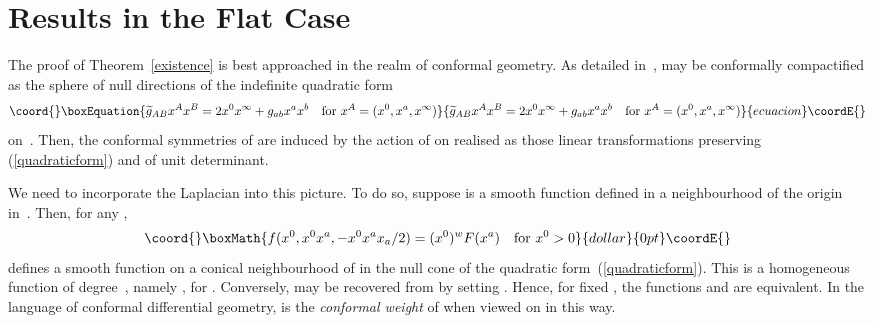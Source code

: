 \documentclass[a4paper,12pt]{amsart}
\begin{document}
\section{Results in the Flat Case}\label{flatresults}
The proof of Theorem~\ref{existence} is best approached in the realm of
conformal geometry. As detailed in~\cite[\S{2}]{eg}, \coordHE{} may be
conformally compactified as the sphere \coordHE{}
of null directions of the indefinite quadratic form
\begin{equation}\coord{}\boxEquation{\label{quadraticform}
\widetilde g_{AB}x^Ax^B=2x^0x^\infty+g_{ab}x^ax^b
\quad\mbox{for }x^A=(x^0,x^a,x^\infty)}{\widetilde g_{AB}x^Ax^B=2x^0x^\infty+g_{ab}x^ax^b
\quad\mbox{for }x^A=(x^0,x^a,x^\infty)}{ecuacion}\coordE{}\end{equation}
on~\coordHE{}. Then, the conformal symmetries of \coordHE{} are induced by
the action of \coordHE{} on \coordHE{} realised as those
linear transformations preserving (\ref{quadraticform}) and of unit
determinant.

We need to incorporate the Laplacian into this picture. To do so,
suppose \coordHE{} is a smooth function defined in a neighbourhood of the
origin in~\coordHE{}. Then, for any \coordHE{},
$$\coord{}\boxMath{f(x^0,x^0x^a,-x^0x^ax_a/2)=(x^0)^wF(x^a)\quad\mbox{for }x^0>0}{dollar}{0pt}\coordE{}$$
defines a smooth function \coordHE{} on a conical neighbourhood of \coordHE{} in the
null cone \coordHE{} of the quadratic form~(\ref{quadraticform}). This
is a homogeneous function of degree~\coordHE{}, namely
\coordHE{}, for \coordHE{}.
Conversely, \coordHE{} may be recovered from \coordHE{} by setting \coordHE{}. Hence,
for fixed \coordHE{}, the functions \coordHE{} and \coordHE{} are equivalent. In the language of
conformal differential geometry, \coordHE{} is the {\em conformal weight\/} of \coordHE{}
when viewed on \coordHE{} in this way.
\end{document}
